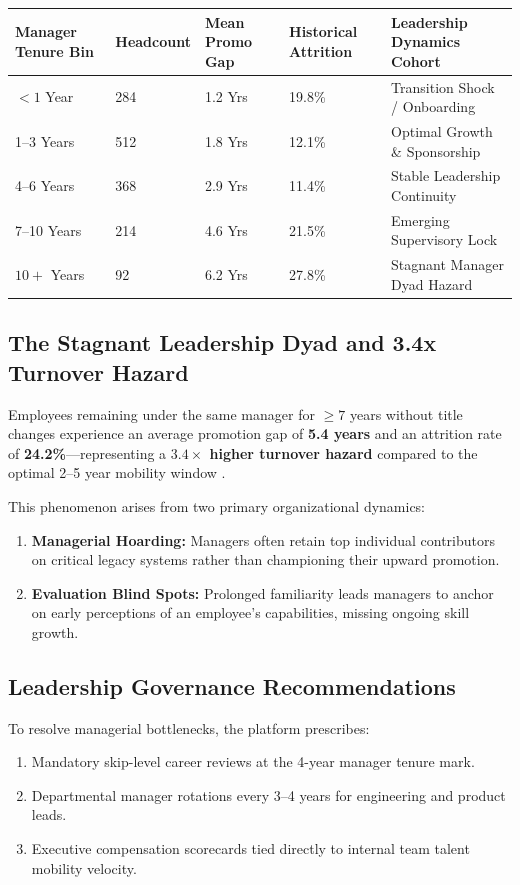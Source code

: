 \documentclass[12pt,a4paper,oneside]{article}
\begin{document}
\begin{center}
\fontsize{9}{11}\selectfont
\begin{tabular}{|C{2.4cm}|C{1.8cm}|C{2.4cm}|C{2.4cm}|L{5.0cm}|}
\hline
\textbf{Manager Tenure Bin} & \textbf{Headcount} & \textbf{Mean Promo Gap} & \textbf{Historical Attrition} & \textbf{Leadership Dynamics Cohort} \\ \hline
$< 1$ Year & 284 & 1.2 Yrs & 19.8\% & Transition Shock / Onboarding \\ --3 Years & 512 & 1.8 Yrs & 12.1\% & Optimal Growth \& Sponsorship \\ --6 Years & 368 & 2.9 Yrs & 11.4\% & Stable Leadership Continuity \\ --10 Years & 214 & 4.6 Yrs & 21.5\% & Emerging Supervisory Lock \\ \hline
$10+$ Years & 92 & 6.2 Yrs & 27.8\% & Stagnant Manager Dyad Hazard \\ \hline
\end{tabular}
\vspace{0.02in}
\label{tab:manager_continuity_matrix}
\end{center}

\subsection{The Stagnant Leadership Dyad and 3.4x Turnover Hazard}
Employees remaining under the same manager for $\ge 7$ years without title changes experience an average promotion gap of \textbf{5.4 years} and an attrition rate of \textbf{24.2\%}---representing a \textbf{$3.4\times$ higher turnover hazard} compared to the optimal 2--5 year mobility window \cite{ref_campion_rotation}.

This phenomenon arises from two primary organizational dynamics:
\begin{enumerate}
  \item \textbf{Managerial Hoarding:} Managers often retain top individual contributors on critical legacy systems rather than championing their upward promotion.
  \item \textbf{Evaluation Blind Spots:} Prolonged familiarity leads managers to anchor on early perceptions of an employee's capabilities, missing ongoing skill growth.
\end{enumerate}

\subsection{Leadership Governance Recommendations}
To resolve managerial bottlenecks, the platform prescribes:
\begin{enumerate}
  \item Mandatory skip-level career reviews at the 4-year manager tenure mark.
  \item Departmental manager rotations every 3--4 years for engineering and product leads.
  \item Executive compensation scorecards tied directly to internal team talent mobility velocity.
\end{enumerate}
\end{document}
